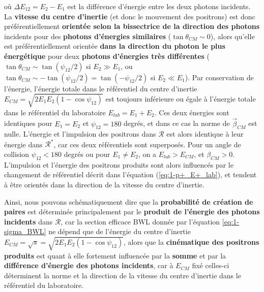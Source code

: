 \begin{refsection}
\begin{equation}
\end{equation}
où $\Delta E_{12}=E_2-E_1$ est la différence d'énergie entre les deux photons incidents. La \textbf{vitesse du centre d'inertie} (et donc le mouvement des positrons) est donc préférentiellement \textbf{orientée selon la bissectrice de la direction des photons} incidents pour des \textbf{photons d'énergies similaires} ($\tan{\theta_{CM}} \sim 0$), alors qu'elle est préférentiellement orientée \textbf{dans la direction du photon le plus énergétique} pour deux \textbf{photons d'énergies très différentes} ($\tan{\theta_{CM}} \sim \tan(\psi_{12}/2)$ si $E_{2} \gg E_1$, ou $\tan{\theta_{CM}}\sim -\tan(\psi_{12}/2)=\tan(-\psi_{12}/2)$ si $E_2 \ll E_1$). 
Par conservation de l'énergie, l'énergie totale dans le référentiel du centre d'inertie $E_{CM}=\sqrt{2 E_1 E_2 (1-\cos{\psi_{12}})}$ est toujours inférieure ou égale à l'énergie totale dans le référentiel du laboratoire $E_{lab}=E_1+E_2$. Ces deux énergies sont identiques pour $E_1=E_2$ et $\psi_{12}=180$ degrés, et dans ce cas la norme de $\vec{\beta}_{CM}$ est nulle. L'énergie et l'impulsion des positrons dans $\mathcal{R}$ est alors identique à leur énergie dans $\mathcal{R}^*$, car ces deux référentiels sont superposés.
Pour un angle de collision $\psi_{12}<180$ degrés ou pour $E_1 \neq E_2$, on a $E_{lab}>E_{CM}$, et $\beta_{CM}>0$. L'impulsion et l'énergie des positrons produits sont alors influencés par le changement de référentiel décrit dans l'équation (\ref{eq:1-p+_E+_lab}), et tendent à être orientés dans la direction de la vitesse du centre d'inertie. 

Ainsi, nous pouvons schématiquement dire que la \textbf{probabilité de création de paires} est déterminée principalement par le \textbf{produit de l'énergie des photons incidents} dans $\mathcal{R}$, car la section efficace BWL donnée par l'équation \ref{eq:1-sigma_BWL} ne dépend que de l'énergie du centre d'inertie $E_{CM}=\sqrt{s}=\sqrt{2 E_1 E_2 (1-\cos{\psi_{12}})}$, alors que la \textbf{cinématique des positrons produits} est quant à elle fortement influencée par la \textbf{somme} et par la \textbf{différence d'énergie des photons incidents}, car à $E_{CM}$ fixé celles-ci déterminent la norme et la direction de la vitesse du centre d'inertie dans le référentiel du laboratoire. 


\end{refsection}

